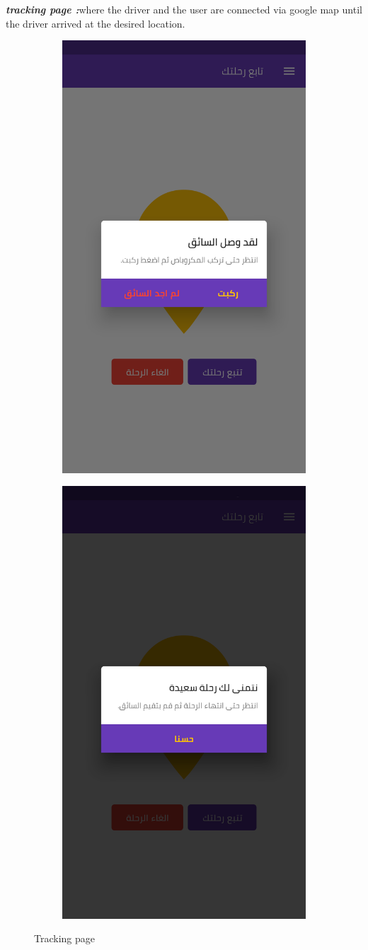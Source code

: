 \textbf{\textit{tracking page :}}where the driver and the user are connected via google map until the driver arrived at the desired location.

\begin{figure}[H] 
  \begin{subfigure}[b]{0.5\linewidth}
    \centering
    \includegraphics[width=0.5\linewidth]{images/ch3/7.png}
     
    \label{fig7:a} 
  \end{subfigure}%
  \begin{subfigure}[b]{0.5\linewidth}
    \centering
    \includegraphics[width=0.5\linewidth]{images/ch3/8.png} 
    
    \label{fig7:d} 
  \end{subfigure} 
  \caption{ Tracking page}
  \label{fig7} 
\end{figure}

